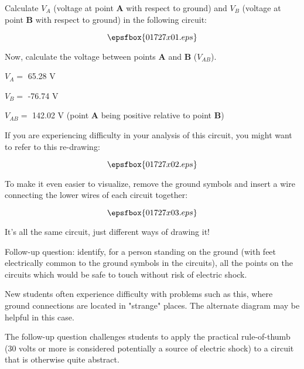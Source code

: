 

Calculate $V_A$ (voltage at point {\bf A} with respect to ground) and $V_B$ (voltage at point {\bf B} with respect to ground) in the following circuit:

$$\epsfbox{01727x01.eps}$$

Now, calculate the voltage between points {\bf A} and {\bf B} ($V_{AB}$).







$V_A =$ 65.28 V

$V_B =$ -76.74 V

$V_{AB} =$ 142.02 V (point {\bf A} being positive relative to point {\bf B})

\vskip 10pt

If you are experiencing difficulty in your analysis of this circuit, you might want to refer to this re-drawing:

$$\epsfbox{01727x02.eps}$$

To make it even easier to visualize, remove the ground symbols and insert a wire connecting the lower wires of each circuit together:

$$\epsfbox{01727x03.eps}$$

It's all the same circuit, just different ways of drawing it!

\vskip 10pt

Follow-up question: identify, for a person standing on the ground (with feet electrically common to the ground symbols in the circuits), all the points on the circuits which would be safe to touch without risk of electric shock. 







New students often experience difficulty with problems such as this, where ground connections are located in "strange" places.  The alternate diagram may be helpful in this case.

The follow-up question challenges students to apply the practical rule-of-thumb (30 volts or more is considered potentially a source of electric shock) to a circuit that is otherwise quite abstract.




